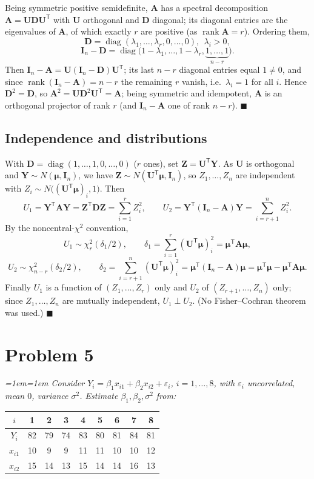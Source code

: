\documentclass[11pt]{article}
\DeclareMathOperator{\rank}{rank}
\newcommand{\bY}{\mathbf{Y}}
\newcommand{\bZ}{\mathbf{Z}}
\newcommand{\bA}{\mathbf{A}}
\newcommand{\bI}{\mathbf{I}}
\newcommand{\bU}{\mathbf{U}}
\newcommand{\bD}{\mathbf{D}}
\newcommand{\bmu}{\bm{\mu}}
\newcommand{\T}{^{\mathsf{T}}}
\theoremstyle{remark}
\newenvironment{question}%
  {\smallskip\itshape\leftskip=1em\rightskip=1em\relax}%
  {\par\smallskip\noindent\hrulefill\par}
\begin{document}
Being symmetric positive semidefinite, $\bA$ has a spectral decomposition $\bA=\bU\bD\bU\T$ with $\bU$
orthogonal and $\bD$ diagonal; its diagonal entries are the eigenvalues of $\bA$, of which exactly $r$ are
positive (as $\rank\bA=r$). Ordering them,
\[
\bD=\operatorname{diag}(\lambda_1,\dots,\lambda_r,0,\dots,0),\ \ \lambda_i>0,
\]
\[
\bI_n-\bD=\operatorname{diag}\big(1-\lambda_1,\dots,1-\lambda_r,\underbrace{1,\dots,1}_{n-r}\big).
\]
Then $\bI_n-\bA=\bU(\bI_n-\bD)\bU\T$; its last $n-r$ diagonal entries equal $1\neq0$, and since
$\rank(\bI_n-\bA)=n-r$ the remaining $r$ vanish, i.e.\ $\lambda_i=1$ for all $i$. Hence $\bD^2=\bD$, so
$\bA^2=\bU\bD^2\bU\T=\bA$; being symmetric and idempotent, $\bA$ is an orthogonal projector of rank $r$ (and
$\bI_n-\bA$ one of rank $n-r$).
\hfill$\blacksquare$

\subsection*{Independence and distributions}

With $\bD=\operatorname{diag}(1,\dots,1,0,\dots,0)$ ($r$ ones), set $\bZ=\bU\T\bY$. As $\bU$ is orthogonal
and $\bY\sim N(\bmu,\bI_n)$, we have $\bZ\sim N(\bU\T\bmu,\bI_n)$, so $Z_1,\dots,Z_n$ are independent with
$Z_i\sim N\big((\bU\T\bmu)_i,1\big)$. Then
\[
U_1=\bY\T\bA\bY=\bZ\T\bD\bZ=\sum_{i=1}^{r}Z_i^2,\qquad
U_2=\bY\T(\bI_n-\bA)\bY=\sum_{i=r+1}^{n}Z_i^2.
\]
By the noncentral-$\chi^2$ convention,
\[
U_1\sim\chi^2_r(\delta_1/2),\qquad \delta_1=\sum_{i=1}^r(\bU\T\bmu)_i^2=\bmu\T\bA\bmu,
\]
\[
U_2\sim\chi^2_{n-r}(\delta_2/2),\qquad \delta_2=\sum_{i=r+1}^n(\bU\T\bmu)_i^2=\bmu\T(\bI_n-\bA)\bmu=\bmu\T\bmu-\bmu\T\bA\bmu.
\]
Finally $U_1$ is a function of $(Z_1,\dots,Z_r)$ only and $U_2$ of $(Z_{r+1},\dots,Z_n)$ only; since
$Z_1,\dots,Z_n$ are mutually independent, $U_1\perp U_2$. (No Fisher--Cochran theorem was used.)
\hfill$\blacksquare$

\section*{Problem 5}

\begin{question}
Consider $Y_i=\beta_1x_{i1}+\beta_2x_{i2}+\varepsilon_i$, $i=1,\dots,8$, with $\varepsilon_i$ uncorrelated,
mean $0$, variance $\sigma^2$. Estimate $\beta_1,\beta_2,\sigma^2$ from:
\par\smallskip\centering\upshape
\begin{tabular}{c|cccccccc}
$i$ & 1&2&3&4&5&6&7&8\\\hline
$Y_i$ & 82&79&74&83&80&81&84&81\\
$x_{i1}$ & 10&9&9&11&11&10&10&12\\
$x_{i2}$ & 15&14&13&15&14&14&16&13
\end{tabular}
\end{question}
\end{document}
